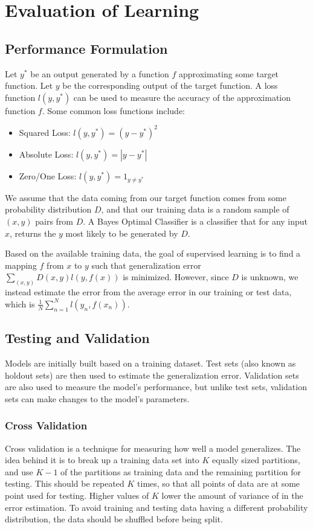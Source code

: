 \documentclass[12pt]{article}
\begin{document}
\section{Evaluation of Learning}
    \subsection{Performance Formulation}
        Let $y^*$ be an output generated by a function $f$ approximating some target function. Let $y$ be the corresponding
        output of the target function. A loss function $l(y, y^*)$ can be used to measure the accuracy of the approximation
        function $f$. Some common loss functions include:
        \begin{itemize}
        \item Squared Loss: $l(y, y^*) = (y - y^*)^2$
        \item Absolute Loss: $l(y, y^*) = |y - y^*|$
        \item Zero/One Loss: $l(y, y^*) = 1_{y \neq y^*}$
        \end{itemize}

        We assume that the data coming from our target function comes from some probability distribution $D$, and that our training data
        is a random sample of $(x, y)$ pairs from $D$. A Bayes Optimal Classifier is a classifier that for any input $x$, returns the
        $y$ most likely to be generated by $D$.

        Based on the available training data, the goal of supervised learning is to find a mapping $f$ from $x$ to $y$ such that
        generalization error $\sum_{(x,y)} D(x,y)l(y,f(x))$ is minimized. However, since $D$ is unknown, we instead estimate the error from
        the average error in our training or test data, which is $\frac{1}{N}\sum_{n=1}^N l(y_n, f(x_n))$.

    \subsection{Testing and Validation}
        Models are initially built based on a training dataset. Test sets (also known as holdout sets) are then used to estimate the generalization
        error. Validation sets are also used to measure the model's performance, but unlike test sets, validation sets can make changes to the model's
        parameters.

        \subsubsection{Cross Validation}
            Cross validation is a technique for measuring how well a model generalizes. The idea behind it is to break up a training data set into $K$
            equally sized partitions, and use $K-1$ of the partitions as training data and the remaining partition for testing. This should be repeated
            $K$ times, so that all points of data are at some point used for testing. Higher values of $K$ lower the amount of variance of in the error
            estimation. To avoid training and testing data having a different probability distribution, the data should be shuffled before being split.
\end{document}
